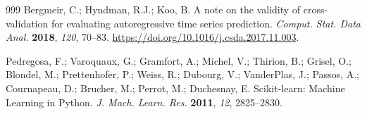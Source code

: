 \documentclass[preprints,article,submit,pdftex,oneauthor]{Definitions/mdpi}
\begin{document}
\begin{thebibliography}{999}
Bergmeir, C.; Hyndman, R.J.; Koo, B. A note on the validity of cross-validation for evaluating autoregressive time series prediction. \textit{Comput. Stat. Data Anal.} \textbf{2018}, \textit{120}, 70--83. \url{https://doi.org/10.1016/j.csda.2017.11.003}.

Pedregosa, F.; Varoquaux, G.; Gramfort, A.; Michel, V.; Thirion, B.; Grisel, O.; Blondel, M.; Prettenhofer, P.; Weiss, R.; Dubourg, V.; VanderPlas, J.; Passos, A.; Cournapeau, D.; Brucher, M.; Perrot, M.; Duchesnay, E. Scikit-learn: Machine Learning in Python. \textit{J. Mach. Learn. Res.} \textbf{2011}, \textit{12}, 2825--2830.

\end{thebibliography}
\end{document}

